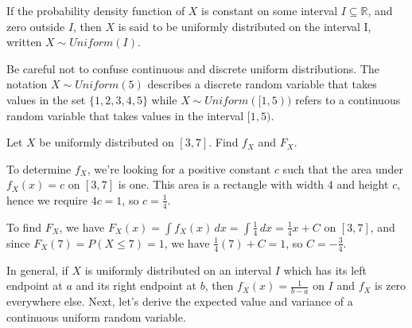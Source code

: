 \begin{defn} If the probability density function of $X$ is constant on some interval $I \subseteq \mathbb{R}$, and zero outside $I$, then $X$ is said to be uniformly distributed on the interval I, written $X \sim Uniform(I)$.
\end{defn}
\par
\rmk Be careful not to confuse continuous and discrete uniform distributions. The notation $X \sim Uniform(5)$ describes a discrete random variable that takes values in the set $\{1,2,3,4,5\}$ while $X \sim Uniform([1,5))$ refers to a continuous random variable that takes values in the interval $[1,5)$.
\begin{examp} Let $X$ be uniformly distributed on $[3,7]$. Find $f_X$ and $F_X$.
\par
\noindent To determine $f_X$, we're looking for a positive constant $c$ such that the area under $f_X(x) = c$ on $[3,7]$ is one. This area is a rectangle with width $4$ and height $c$, hence we require $4c = 1$, so $c = \frac{1}{4}$.
\renewcommand*{\arraystretch}{1.35}
\renewcommand*{\arraystretch}{1}
\par
\noindent To find $F_X$, we have $F_X(x) = \int f_X(x) \,dx = \int \frac{1}{4}\,dx = \frac{1}{4}x + C$ on $[3,7]$, and since $F_X(7) = P(X \leq 7) = 1$, we have $\frac{1}{4}(7) + C = 1$, so $C = -\frac{3}{4}$.
\renewcommand*{\arraystretch}{1.35}
\renewcommand*{\arraystretch}{1}
\end{examp}
\vspace{-0.5em}
\par
\noindent In general, if $X$ is uniformly distributed on an interval $I$ which has its left endpoint at $a$ and its right endpoint at $b$, then $f_X(x) = \frac{1}{b-a}$ on $I$ and $f_X$ is zero everywhere else. Next, let's derive the expected value and variance of a continuous uniform random variable.
